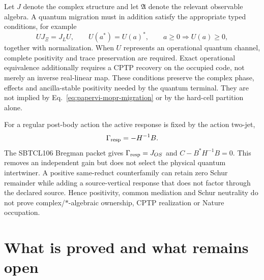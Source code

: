 \documentclass[11pt]{article}
\begin{document}
Let \(J\) denote the complex structure and let \(\mathfrak A\) denote the
relevant observable algebra.  A quantum migration must in addition satisfy
the appropriate typed conditions, for example
\begin{equation}
 UJ_{\Xi}=J_LU,\qquad
 U(a^*)=U(a)^*,\qquad
 a\geq0\Longrightarrow U(a)\geq0,
 \label{eq:papervi-quantum-structure-migration}
\end{equation}
together with normalization.  When \(U\) represents an operational quantum
channel, complete positivity and trace preservation are required.  Exact
operational equivalence additionally requires a CPTP recovery on the occupied
code, not merely an inverse real-linear map.  These conditions preserve the
complex phase, effects and ancilla-stable positivity needed by the quantum
terminal.  They are not implied by Eq.~\eqref{eq:papervi-mopr-migration} or by
the hard-cell partition alone.

For a regular post-body action the active response is fixed by the action
two-jet,
\begin{equation}
 \Gamma_{\rm resp}=-H^{-1}B.
 \label{eq:papervi-mixed-hessian-solder}
\end{equation}
The SBTCL106 Bregman packet gives
\(\Gamma_{\rm resp}=J_{OS}\) and \(C-B^*H^{-1}B=0\).  This removes an
independent gain but does not select the physical quantum intertwiner.  A
positive same-reduct counterfamily can retain zero Schur remainder while
adding a source-vertical response that does not factor through the declared
source.  Hence positivity, common mediation and Schur neutrality do not prove
complex/\(*\)-algebraic ownership, CPTP realization or Nature occupation.

\section{What is proved and what remains open}
\end{document}

